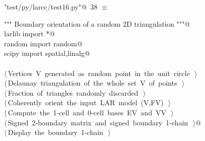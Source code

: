 \documentclass[11pt,oneside]{article}    %
\begin{document}
\begin{flushleft} \small \label{scrap60}
\protect{}\verb@"test/py/larcc/test16.py"@\nobreak\ {\footnotesize 38 }$\equiv$
\vspace{-1ex}
\begin{list}{}{} \item
\mbox{}\verb@""" Boundary orientation of a random 2D triangulation """@\\
\mbox{}\verb@from larlib import *@\\
\mbox{}\verb@from random import random@\\
\mbox{}\verb@from scipy import spatial,linalg@\\
\mbox{}\verb@@\\
\mbox{}\verb@@\hbox{$\langle\,$Vertices V generated as random point in the unit circle\nobreak\ {\footnotesize {}}$\,\rangle$}\verb@@\\
\mbox{}\verb@@\hbox{$\langle\,$Delaunay triangulation of the whole set V of points\nobreak\ {\footnotesize {}}$\,\rangle$}\verb@@\\
\mbox{}\verb@@\hbox{$\langle\,$Fraction of triangles randomly discarded\nobreak\ {\footnotesize {}}$\,\rangle$}\verb@@\\
\mbox{}\verb@@\hbox{$\langle\,$Coherently orient the input LAR model (V,FV)\nobreak\ {\footnotesize {}}$\,\rangle$}\verb@@\\
\mbox{}\verb@@\hbox{$\langle\,$Compute the 1-cell and 0-cell bases EV and VV\nobreak\ {\footnotesize {}}$\,\rangle$}\verb@@\\
\mbox{}\verb@@\hbox{$\langle\,$Signed 2-boundary matrix and signed boundary 1-chain\nobreak\ {\footnotesize {}}$\,\rangle$}\verb@    @\\
\mbox{}\verb@@\hbox{$\langle\,$Display the boundary 1-chain\nobreak\ {\footnotesize {}}$\,\rangle$}\verb@@\\
\mbox{}\verb@@{\NWsep}
\end{list}
\vspace{-2ex}
\end{flushleft}
\end{document}
